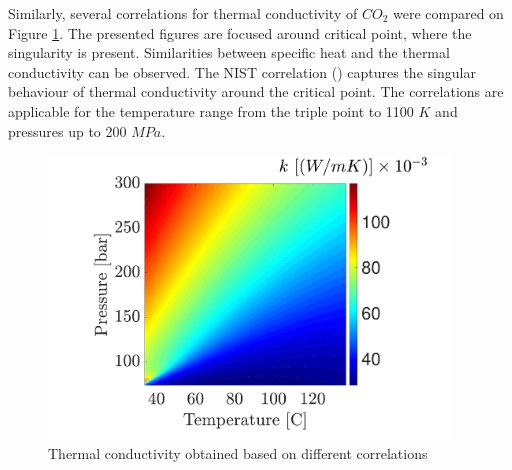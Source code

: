 \documentclass[../Article_Design_of_Experiment.tex]{subfiles}
\begin{document}
        Similarly, several correlations for thermal conductivity of $CO_2$ were compared on Figure \ref{fig: SFE_Properties_kt}. The presented figures are focused around critical point, where the singularity is present. Similarities between specific heat and the thermal conductivity can be observed. The NIST correlation (\citet{Huber2016}) captures the singular behaviour of thermal conductivity around the critical point. The correlations are applicable for the temperature range from the triple point to 1100 $K$ and pressures up to 200 $MPa$. 

        \begin{figure}[H]
			\centering
			\includegraphics[trim = 1.5cm 2.5cm 1.5cm 2.0cm,clip,width=0.95\textwidth]{Figures/KT.pdf}	
			\caption{Thermal conductivity obtained based on different correlations }
            \label{fig: SFE_Properties_kt}
		\end{figure} 
\end{document}
